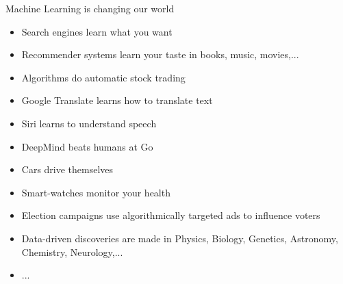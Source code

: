 \documentclass[11pt,compress,t,notes=noshow, xcolor=table]{beamer}
\begin{document}

\begin{frame}{Machine Learning is changing our world}

\begin{itemize}

  \item Search engines learn what you want
  
  \item Recommender systems learn your taste in books, music, movies,...
  
  \item Algorithms do automatic stock trading
  
  \item Google Translate learns how to translate text
  
  \item Siri learns to understand speech
  
  \item DeepMind beats humans at Go
  
  \item Cars drive themselves
  
  
  \item Smart-watches monitor your health
  
  \item Election campaigns use algorithmically targeted ads to influence voters
  
  \item Data-driven discoveries are made in Physics, Biology, Genetics, 
  Astronomy, Chemistry, Neurology,...
  
  \item ...
  
\end{itemize}

\end{frame}

\end{document}
